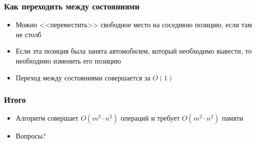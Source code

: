 \begin{frame}
  \frametitle{Как переходить между состояниями}
  \begin{itemize}
    \item Можно <<переместить>> свободное место на соседнюю позицию, если там не столб 
    \item Если эта позиция была занята автомобилем, который необходимо вывести, то необходимо
    		изменить его позицию
    \item Переход между состояниями совершается за $O(1)$      
  \end{itemize}
\end{frame}

\begin{frame}
  \frametitle{Итого}
  \begin{itemize}
    \item Алгоритм совершает $O(m^2 \cdot n^2)$ операций и требует $O(m^2 \cdot n^2)$ памяти 
    \item Вопросы?
  \end{itemize}
\end{frame}
